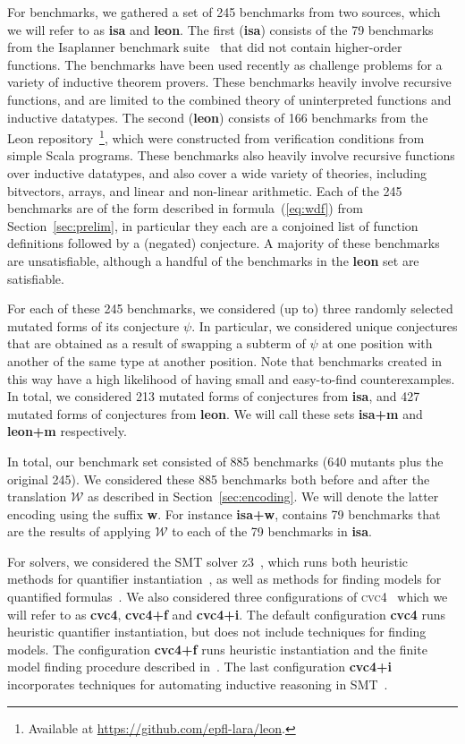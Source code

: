 \documentclass[runningheads,a4paper]{llncs}
\newcommand{\cvc}{\textsc{cvc}{\small 4}\xspace}
\newcommand{\ziii}{\textsc{z}{\small 3}\xspace}
\newcommand{\conv}{\mathcal{W}}
\begin{document}
For benchmarks, we gathered a set of 245 benchmarks from two sources, which we will refer to as {\bf isa} and {\bf leon}.
The first ({\bf isa}) consists of the 79 benchmarks from the Isaplanner benchmark suite~\cite{DBLP:conf/itp/JohanssonDB10} that did not contain higher-order functions.
The benchmarks have been used recently as challenge problems for a variety of inductive theorem provers.
These benchmarks heavily involve recursive functions, and are limited to the combined theory of uninterpreted functions and inductive datatypes.
The second ({\bf leon}) consists of 166 benchmarks from the Leon repository~\footnote{Available at \url{https://github.com/epfl-lara/leon}.},
which were constructed from verification conditions from simple Scala programs.
These benchmarks also heavily involve recursive functions over inductive datatypes, 
and also cover a wide variety of theories, including bitvectors, arrays, and linear and non-linear arithmetic.
Each of the 245 benchmarks are of the form described in formula~(\ref{eq:wdf}) from Section~\ref{sec:prelim},
in particular they each are a conjoined list of function definitions followed by a (negated) conjecture.
A majority of these benchmarks are unsatisfiable, although a handful of the benchmarks in the {\bf leon} set are satisfiable.

For each of these 245 benchmarks, we considered (up to) three randomly selected mutated forms of its conjecture $\psi$.
In particular, we considered unique conjectures that are obtained as a result of swapping a subterm of $\psi$ at one position
with another of the same type at another position.
Note that benchmarks created in this way have a high likelihood of having small and easy-to-find counterexamples.
In total, we considered 213 mutated forms of conjectures from {\bf isa}, and 427 mutated forms of conjectures from {\bf leon}.
We will call these sets {\bf isa+m} and {\bf leon+m} respectively.

In total, our benchmark set consisted of 885 benchmarks (640 mutants plus the original 245).
We considered these 885 benchmarks both before and after the translation $\conv$ as described in Section~\ref{sec:encoding}.
We will denote the latter encoding using the suffix {\bf w}.
For instance {\bf isa+w}, contains 79 benchmarks that are the results of applying $\conv$ to each of the 79 benchmarks in {\bf isa}.

For solvers, we considered the SMT solver \ziii~\cite{de-moura-bjoerner-2008}, 
which runs both heuristic methods for quantifier instantiation~\cite{DBLP:conf/cade/MouraB07},
as well as methods for finding models for quantified formulas~\cite{GeDeM-CAV-09}.
We also considered three configurations of \cvc~\cite{barrett-et-al-2011} which we will refer to as {\bf cvc4}, {\bf cvc4+f} and {\bf cvc4+i}.
The default configuration {\bf cvc4} runs heuristic quantifier instantiation, 
but does not include techniques for finding models.
The configuration {\bf cvc4+f} runs heuristic instantiation and the finite model finding procedure described in~\cite{ReyEtAl-1-RR-13, reynolds-et-al-2013}.
The last configuration {\bf cvc4+i} incorporates techniques for automating inductive reasoning in SMT~\cite{reynolds-kuncak-2015}.
\end{document}
